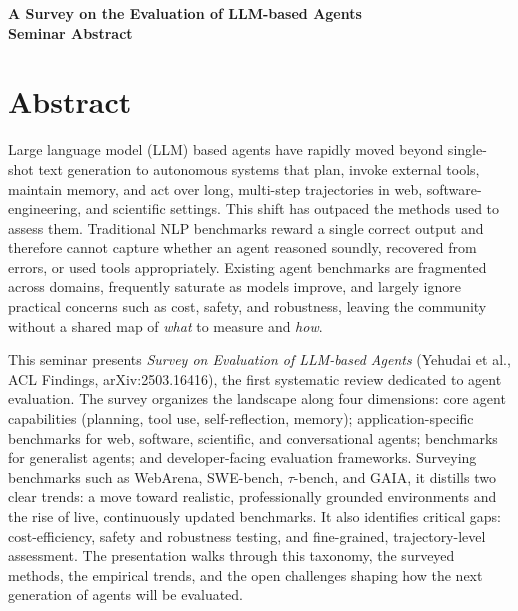 \documentclass[11pt]{article}
\begin{document}
\begin{center}
{\LARGE\bfseries A Survey on the Evaluation of LLM-based Agents}\\[1.1em]
{\large\bfseries Seminar Abstract}\\[0.6em]
{\normalsize \seminarDate}
\end{center}
\vspace{0.6em}
\section*{Abstract}
Large language model (LLM) based agents have rapidly moved beyond single-shot text generation to autonomous systems that plan, invoke external tools, maintain memory, and act over long, multi-step trajectories in web, software-engineering, and scientific settings. This shift has outpaced the methods used to assess them. Traditional NLP benchmarks reward a single correct output and therefore cannot capture whether an agent reasoned soundly, recovered from errors, or used tools appropriately. Existing agent benchmarks are fragmented across domains, frequently saturate as models improve, and largely ignore practical concerns such as cost, safety, and robustness, leaving the community without a shared map of \emph{what} to measure and \emph{how}.

This seminar presents \emph{Survey on Evaluation of LLM-based Agents} (Yehudai et al., ACL Findings, arXiv:2503.16416), the first systematic review dedicated to agent evaluation. The survey organizes the landscape along four dimensions: core agent capabilities (planning, tool use, self-reflection, memory); application-specific benchmarks for web, software, scientific, and conversational agents; benchmarks for generalist agents; and developer-facing evaluation frameworks. Surveying benchmarks such as WebArena, SWE-bench, $\tau$-bench, and GAIA, it distills two clear trends: a move toward realistic, professionally grounded environments and the rise of live, continuously updated benchmarks. It also identifies critical gaps: cost-efficiency, safety and robustness testing, and fine-grained, trajectory-level assessment. The presentation walks through this taxonomy, the surveyed methods, the empirical trends, and the open challenges shaping how the next generation of agents will be evaluated.
\end{document}

